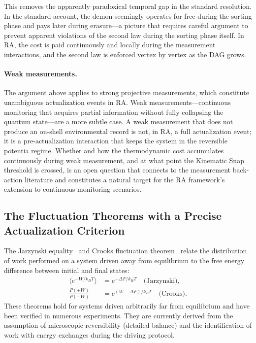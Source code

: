 \documentclass[11pt,a4paper]{article}
\theoremstyle{plain}
\theoremstyle{definition}
\theoremstyle{remark}
\begin{document}
This removes the apparently paradoxical temporal gap in the standard resolution.
In the standard account, the demon seemingly operates for free during the sorting
phase and pays later during erasure---a picture that requires careful argument to
prevent apparent violations of the second law during the sorting phase itself. In
RA, the cost is paid continuously and locally during the measurement interactions,
and the second law is enforced vertex by vertex as the DAG grows.

\paragraph{Weak measurements.}
The argument above applies to strong projective measurements, which constitute
unambiguous actualization events in RA. Weak measurements---continuous monitoring
that acquires partial information without fully collapsing the quantum state---are
a more subtle case. A weak measurement that does not produce an on-shell
environmental record is not, in RA, a full actualization event; it is a
pre-actualization interaction that keeps the system in the reversible potentia
regime. Whether and how the thermodynamic cost accumulates continuously during
weak measurement, and at what point the Kinematic Snap threshold is crossed, is
an open question that connects to the measurement back-action literature and
constitutes a natural target for the RA framework's extension to continuous
monitoring scenarios.

\subsection{The Fluctuation Theorems with a Precise Actualization Criterion}

The Jarzynski equality~\citep{Jarzynski1997} and Crooks fluctuation
theorem~\citep{Crooks1999} relate the distribution of work performed on a system
driven away from equilibrium to the free energy difference between initial and
final states:
\begin{align}
  \langle e^{-W/k_BT} \rangle &= e^{-\Delta F/k_BT} \quad \text{(Jarzynski)}, \\
  \frac{P(+W)}{P(-W)} &= e^{(W - \Delta F)/k_BT} \quad \text{(Crooks)}.
\end{align}
These theorems hold for systems driven arbitrarily far from equilibrium and have
been verified in numerous experiments. They are currently derived from the
assumption of microscopic reversibility (detailed balance) and the identification
of work with energy exchanges during the driving protocol.
\end{document}
